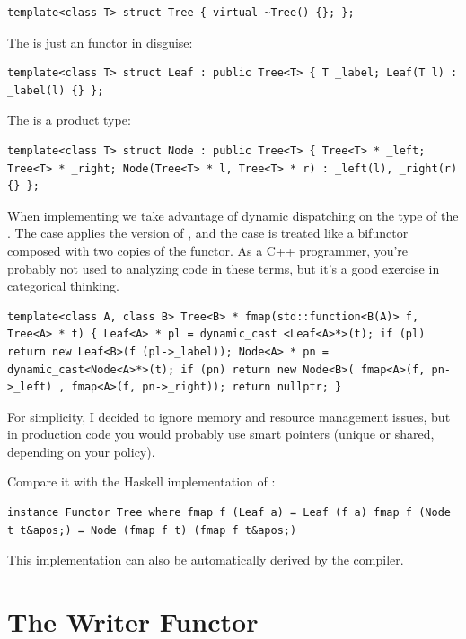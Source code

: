 \begin{verbatim}
template<class T> struct Tree { virtual ~Tree() {}; };
\end{verbatim}

The  is just an  functor in disguise:

\begin{verbatim}
template<class T> struct Leaf : public Tree<T> { T _label; Leaf(T l) : _label(l) {} };
\end{verbatim}

The  is a product type:

\begin{verbatim}
template<class T> struct Node : public Tree<T> { Tree<T> * _left; Tree<T> * _right; Node(Tree<T> * l, Tree<T> * r) : _left(l), _right(r) {} };
\end{verbatim}

When implementing  we take advantage of dynamic dispatching
on the type of the . The  case applies the
 version of , and the  case
is treated like a bifunctor composed with two copies of the
 functor. As a C++ programmer, you're probably not used to
analyzing code in these terms, but it's a good exercise in categorical
thinking.

\begin{verbatim}
template<class A, class B> Tree<B> * fmap(std::function<B(A)> f, Tree<A> * t) { Leaf<A> * pl = dynamic_cast <Leaf<A>*>(t); if (pl) return new Leaf<B>(f (pl->_label)); Node<A> * pn = dynamic_cast<Node<A>*>(t); if (pn) return new Node<B>( fmap<A>(f, pn->_left) , fmap<A>(f, pn->_right)); return nullptr; }
\end{verbatim}

For simplicity, I decided to ignore memory and resource management
issues, but in production code you would probably use smart pointers
(unique or shared, depending on your policy).

Compare it with the Haskell implementation of :

\begin{verbatim}
instance Functor Tree where fmap f (Leaf a) = Leaf (f a) fmap f (Node t t&apos;) = Node (fmap f t) (fmap f t&apos;)
\end{verbatim}

This implementation can also be automatically derived by the compiler.

\section{The Writer Functor}\label{the-writer-functor}

